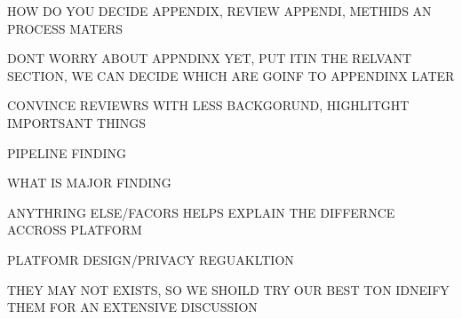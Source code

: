 HOW DO YOU DECIDE APPENDIX, REVIEW APPENDI, METHIDS AN PROCESS MATERS

DONT WORRY ABOUT APPNDINX YET, PUT ITIN THE RELVANT SECTION, WE CAN DECIDE WHICH ARE GOINF TO  APPENDINX LATER


CONVINCE REVIEWRS WITH LESS BACKGORUND, HIGHLITGHT IMPORTSANT THINGS

PIPELINE 
FINDING


WHAT IS MAJOR FINDING

ANYTHRING ELSE/FACORS HELPS EXPLAIN THE DIFFERNCE ACCROSS PLATFORM

PLATFOMR DESIGN/PRIVACY REGUAKLTION

THEY MAY NOT EXISTS, SO WE SHOILD TRY OUR BEST TON IDNEIFY THEM FOR AN EXTENSIVE DISCUSSION


